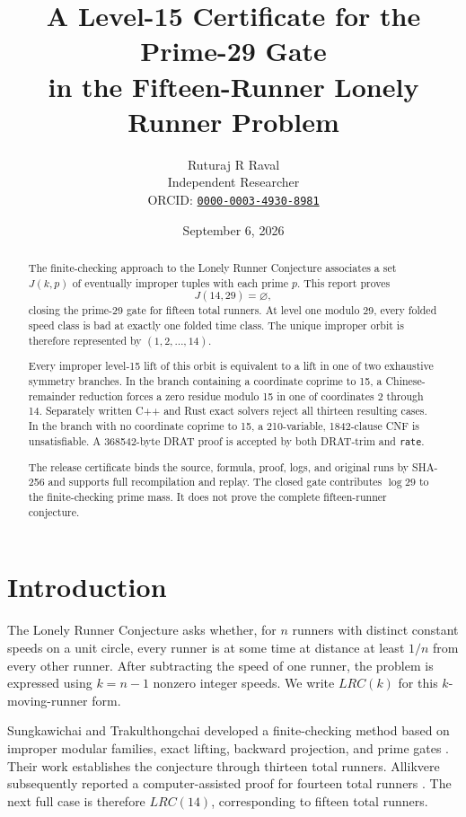 \documentclass[11pt]{article}
\title{A Level-15 Certificate for the Prime-29 Gate\\
in the Fifteen-Runner Lonely Runner Problem}
\author{%
  Ruturaj R Raval\\
  \small Independent Researcher\\
  \small ORCID:
  \href{https://orcid.org/0000-0003-4930-8981}
       {\texttt{0000-0003-4930-8981}}
}
\date{September 6, 2026}
\begin{document}
\maketitle

\begin{abstract}
The finite-checking approach to the Lonely Runner Conjecture associates a
set \(J(k,p)\) of eventually improper tuples with each prime \(p\).  This
report proves
\[
  J(14,29)=\varnothing,
\]
closing the prime-29 gate for fifteen total runners.  At level one modulo
29, every folded speed class is bad at exactly one folded time class.  The
unique improper orbit is therefore represented by
\((1,2,\ldots,14)\).

Every improper level-15 lift of this orbit is equivalent to a lift in one of
two exhaustive symmetry branches.  In the branch containing a coordinate
coprime to 15, a
Chinese-remainder reduction forces a zero residue modulo 15 in one of
coordinates 2 through 14.  Separately written C++ and Rust exact solvers
reject all thirteen resulting cases.  In the branch with no coordinate
coprime to 15, a 210-variable, 1842-clause CNF is unsatisfiable.  A
368542-byte DRAT proof is accepted by both DRAT-trim and \texttt{rate}.

The release certificate binds the source, formula, proof, logs, and original
runs by SHA-256 and supports full recompilation and replay.  The closed gate
contributes \(\log 29\) to the finite-checking prime mass.  It does not prove
the complete fifteen-runner conjecture.
\end{abstract}

\section{Introduction}

The Lonely Runner Conjecture asks whether, for \(n\) runners with distinct
constant speeds on a unit circle, every runner is at some time at distance
at least \(1/n\) from every other runner.  After subtracting the speed of one
runner, the problem is expressed using \(k=n-1\) nonzero integer speeds.  We
write \(LRC(k)\) for this \(k\)-moving-runner form.

Sungkawichai and Trakulthongchai developed a finite-checking method based on
improper modular families, exact lifting, backward projection, and prime
gates \cite{sungkawichai-trakulthongchai}.  Their work establishes the
conjecture through thirteen total runners.  Allikvere subsequently reported
a computer-assisted proof for fourteen total runners
\cite{allikvere-fourteen}.  The next full case is therefore \(LRC(14)\),
corresponding to fifteen total runners.
\end{document}

